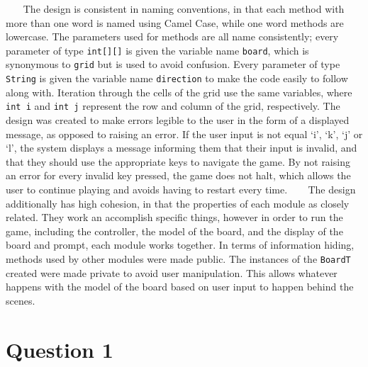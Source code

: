 \documentclass[12pt]{article}
\begin{document}
$~~$$~~$$~~$$~~$The design is consistent in naming conventions, in that each method with more than one word is named using Camel Case, while one word methods are lowercase. The parameters used for methods are all name consistently; every parameter of type \verb|int[][]| is given the variable name \verb|board|, which is synonymous to \verb|grid| but is used to avoid confusion. Every parameter of type \verb|String| is given the variable name \verb|direction| to make the code easily to follow along with. Iteration through the cells of the grid use the same variables, where \verb|int i| and \verb|int j| represent the row and column of the grid, respectively. The design was created to make errors legible to the user in the form of a displayed message, as opposed to raising an error. If the user input is not equal ‘i’, ‘k’, ‘j’ or ‘l’, the system displays a message informing them that their input is invalid, and that they should use the appropriate keys to navigate the game. By not raising an error for every invalid key pressed, the game does not halt, which allows the user to continue playing and avoids having to restart every time. \newline
\newline
$~~$$~~$$~~$$~~$The design additionally has high cohesion, in that the properties of each module as closely related. They work an accomplish specific things, however in order to run the game, including the controller, the model of the board, and the display of the board and prompt, each module works together. In terms of information hiding, methods used by other modules were made public. The instances of the \verb|BoardT| created were made private to avoid user manipulation. This allows whatever happens with the model of the board based on user input to happen behind the scenes. 


\section* {Question 1}
\end{document}
